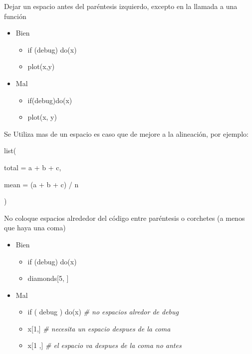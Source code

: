 \begin{enumerate}
Dejar un espacio antes del par\'entesis izquierdo, excepto en la llamada a una funci\'on

\begin{itemize}
\item Bien  
\begin{itemize}
     \item if (debug) do(x)
     \item plot(x,y)
  \end{itemize}
\item Mal
   \begin{itemize}
      \item if(debug)do(x)
     \item plot(x, y)
   \end{itemize}
 \end{itemize}

Se Utiliza mas de un espacio es caso que de mejore a la alineaci\'on, por ejemplo:\\
\begin{list}{}{}
\item list(
    \begin{list}{}{} 
       \item total \hspace{3mm}= a + b + c,
       \item mean \hspace{2mm}= (a + b + c) / n
    \end{list}
\item )
\end{list}
No coloque espacios alrededor del c\'odigo entre par\'entesis o corchetes (a menos que haya una coma)
\begin{itemize}
\item Bien  
\begin{itemize}
     \item if (debug)  do(x)
     \item diamonds[5, ]
  \end{itemize}
\item Mal
   \begin{itemize}
      \item if ( debug ) do(x) \textit{\# no espacios alredor de debug}
      \item x[1,] \textit{\# necesita un espacio despues de la coma}
      \item x[1 ,] \textit{\# el espacio va despues de la coma no antes}	   
\end{itemize}
 \end{itemize}


\end{enumerate}
